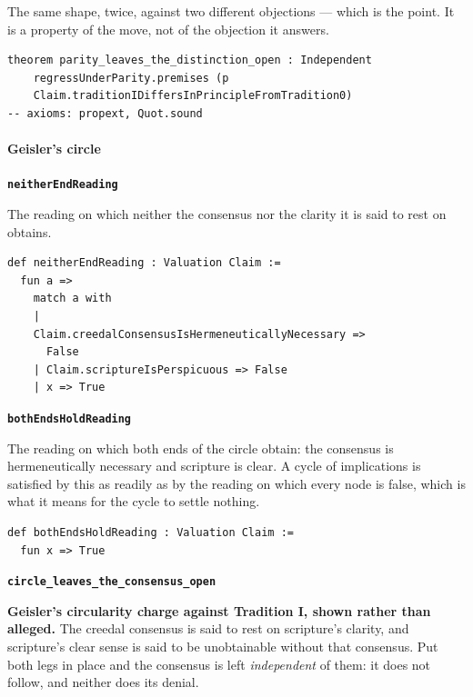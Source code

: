 \documentclass[11pt]{article}
\begin{document}
The same shape, twice, against two different objections — which is the point. It is a property of the move, not of the objection it answers.

{\small\begin{verbatim}
theorem parity_leaves_the_distinction_open : Independent
    regressUnderParity.premises (p
    Claim.traditionIDiffersInPrincipleFromTradition0)
-- axioms: propext, Quot.sound
\end{verbatim}}
\paragraph*{Geisler's circle}
\leavevmode\par
\par\medskip\noindent\textbf{\texttt{neither\allowbreak{}End\allowbreak{}Reading}}\par\nobreak\noindent
The reading on which neither the consensus nor the clarity it is said to rest on obtains.

{\small\begin{verbatim}
def neitherEndReading : Valuation Claim :=
  fun a =>
    match a with
    |
    Claim.creedalConsensusIsHermeneuticallyNecessary =>
      False
    | Claim.scriptureIsPerspicuous => False
    | x => True
\end{verbatim}}
\par\medskip\noindent\textbf{\texttt{both\allowbreak{}Ends\allowbreak{}Hold\allowbreak{}Reading}}\par\nobreak\noindent
The reading on which both ends of the circle obtain: the consensus is hermeneutically necessary and scripture is clear. A cycle of implications is satisfied by this as readily as by the reading on which every node is false, which is what it means for the cycle to settle nothing.

{\small\begin{verbatim}
def bothEndsHoldReading : Valuation Claim :=
  fun x => True
\end{verbatim}}
\par\medskip\noindent\textbf{\texttt{circle\_\allowbreak{}leaves\_\allowbreak{}the\_\allowbreak{}consensus\_\allowbreak{}open}}\par\nobreak\noindent
\textbf{Geisler's circularity charge against Tradition I, shown rather than alleged.} The creedal consensus is said to rest on scripture's clarity, and scripture's clear sense is said to be unobtainable without that consensus. Put both legs in place and the consensus is left \emph{independent} of them: it does not follow, and neither does its denial.
\end{document}
